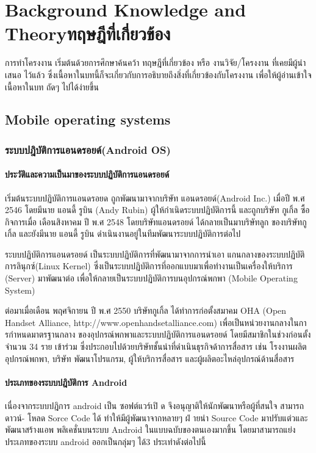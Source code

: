 \chapter{\ifenglish Background Knowledge and Theory\else ทฤษฎีที่เกี่ยวข้อง\fi}
 การทําโครงงาน เริ่มต้นด้วยการศึกษาค้นคว้า ทฤษฎีที่เกี่ยวข้อง หรือ งานวิจัย/โครงงาน ที่เคยมีผู้นําเสนอ
ไว้แล้ว ซึ่งเนื้อหาในบทนี้ก็จะเกี่ยวกับการอธิบายถึงสิ่งที่เกี่ยวข้องกับโครงงาน เพื่อให้ผู้อ่านเข้าใจเนื้อหาในบท
ถัดๆ ไปได้ง่ายขึ้น
\section{Mobile operating systems}
\subsection{ระบบปฎิบัติการแอนดรอยด์(Android OS)}
\subsubsection{ประวัติและความเป็นมาของระบบปฏิบัติการแอนดรอยด์}

 เริ่มต้นระบบปฏิบัติการแอนดรอยด \cite{android} ถูกพัฒนามาจากบริษัท แอนดรอยด์(Android Inc.) เมื่อปี
พ.ศ 2546 โดยมีนาย แอนดี้ รูบิน (Andy Rubin) ผู้ให้กําเนิดระบบปฏิบัติการนี้ และถูกบริษัท กูเกิ้ล ซื้อ
กิจการเมื่อ เดือนสิงหาคม ปี พ.ศ 2548 โดยบริษัทแอนดรอยด์ ได้กลายเป็นมาบริษัทลูก ของบริษัทกูเกิ้ล
และยังมีนาย แอนดี้ รูบิน ดําเนินงานอยู่ในทีมพัฒนาระบบปฏิบัติการต่อไป

ระบบปฏิบัติการแอนดรอยด์ เป็นระบบปฏิบัติการที่พัฒนามาจากการนําเอา แกนกลางของระบบปฏิบัติ
การลินุกซ์(Linux Kernel) ซึ่งเป็นระบบปฏิบัติการที่ออกแบบมาเพื่อทํางานเป็นเครื่องให้บริการ (Server)
มาพัฒนาต่อ เพื่อให้กลายเป็นระบบปฏิบัติการบนอุปกรณ์พกพา (Mobile Operating System)

ต่อมาเมื่อเดือน พฤศจิกายน ปี พ.ศ 2550 บริษัทกูเกิ้ล ได้ทําการก่อตั้งสมาคม OHA (Open Handset Alliance, http://www.openhandsetalliance.com) เพื่อเป็นหน่วยงานกลางในการกําหนดมาตรฐานกลาง ของอุปกรณ์พกพาและระบบปฏิบัติการแอนดรอยด์ โดยมีสมาชิกในช่วงก่อนตั้งจํานวน 34 ราย
เข้าร่วม ซึ่งประกอบไปด้วยบริษัทชั้นนําที่ดําเนินธุรกิจด้าการสื่อสาร เช่น โรงงานผลิตอุปกรณ์พกพา, บริษัท
พัฒนาโปรแกรม, ผู้ให้บริการสื่อสาร และผู้ผลิตอะไหล่อุปกรณ์ด้านสื่อสาร


\subsubsection{ประเภทของระบบปฎิบัติการ Android}
เนื่องจากระบบปฎิการ android เป็น ซอฟต์แวร์เปิ ด จึงอนุญาติให้นักพัฒนาหรือผู้ที่สนใจ สามารถดาวน์-
โหลด Sorce Code ได้ ทําให้มีผู้พัฒนาจากหลายๆ ฝ่ ายนํา Source Code มาปรับแต่วและพัฒนาสร้างแอพ
พลิเคชั่นบนระบบ Android ในแบบฉบับของตนเองมากขึ้น โดยมาสามารถแย่งประเภทของระบบ android
ออกเป็นกลุ่มๆ ได้3 ประเทําดังต่อไปนี้


